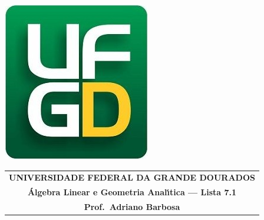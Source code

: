 \documentclass[a4paper,5pt]{amsbook}
\begin{document}
\thispagestyle{empty}
\pagestyle{empty}
\begin{minipage}[h]{0.14\textwidth}
	\includegraphics[scale=0.24]{../../ufgd.png}
\end{minipage}
\begin{minipage}[h]{\textwidth}
\begin{tabular}{c}
{{\bf UNIVERSIDADE FEDERAL DA GRANDE DOURADOS}}\\
{{\bf \'{A}lgebra Linear e Geometria Anal\'{\i}tica --- Lista 7.1}}\\
{{\bf Prof.\ Adriano Barbosa}}\\
\end{tabular}
\vspace{-0.45cm}
%
\end{minipage}

\end{document}
